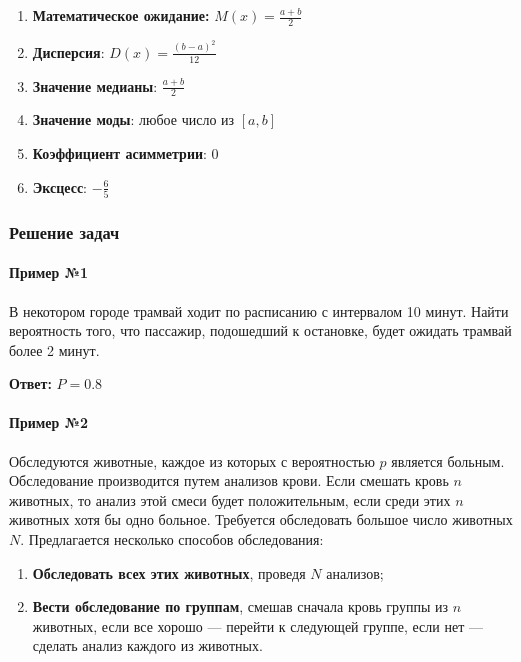 \documentclass{article}
\begin{document}
\begin{multicols}{2}
    \begin{enumerate}
        \item \textbf{Математическое ожидание:} $M(x) = \frac{a + b}{2}$
        \item \textbf{Дисперсия}: $D(x) = \frac{(b - a)^2}{12}$
        \item \textbf{Значение медианы}: $\frac{a + b}{2}$
        \item \textbf{Значение моды}: любое число из $[a, b]$
        \item \textbf{Коэффициент асимметрии}: $0$
        \item \textbf{Эксцесс}: $-\frac{6}{5}$
    \end{enumerate}    
\end{multicols}

\subsubsection{Решение задач}

\paragraph{Пример №1} В некотором городе трамвай ходит по расписанию с интервалом 10 минут. Найти вероятность того, что пассажир, подошедший к остановке, будет ожидать трамвай более 2 минут.

\textbf{Ответ:} $P = 0.8$

\paragraph{Пример №2} Обследуются животные, каждое из которых с вероятностью $p$ является больным. Обследование производится путем анализов крови. Если смешать кровь $n$ животных, то анализ этой смеси будет положительным, если среди этих $n$ животных хотя бы одно больное. Требуется обследовать большое число животных $N$. Предлагается несколько способов обследования:

\begin{enumerate}
    \item \textbf{Обследовать всех этих животных}, проведя $N$ анализов;
    \item \textbf{Вести обследование по группам}, смешав сначала кровь группы из $n$ животных, если все хорошо — перейти к следующей группе, если нет — сделать анализ каждого из животных.
\end{enumerate}
\end{document}
